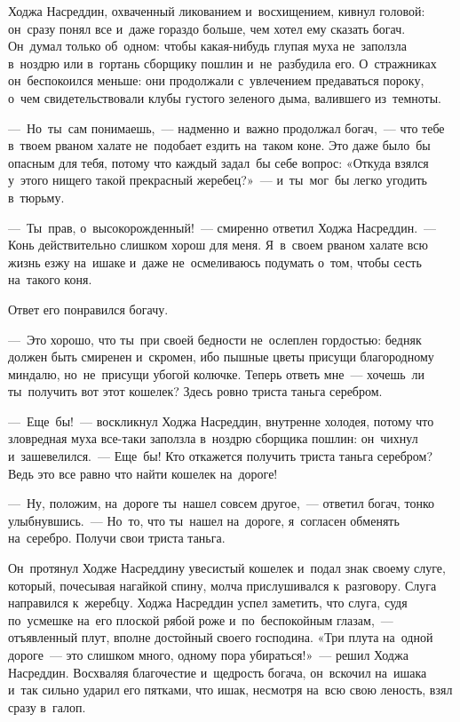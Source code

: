 \documentclass[12pt,a4paper]{book}
\begin{document}
Ходжа Насреддин, охваченный ликованием и~восхищением, кивнул головой: он~сразу понял все и~даже гораздо больше, чем хотел ему сказать богач. Он~думал только об~одном: чтобы какая-нибудь глупая муха не~заползла в~ноздрю или в~гортань сборщику пошлин и~не~разбудила его. О~стражниках он~беспокоился меньше: они продолжали с~увлечением предаваться пороку, о~чем свидетельствовали клубы густого зеленого дыма, валившего из~темноты.

—~Но~ты~сам понимаешь,~— надменно и~важно продолжал богач,~— что тебе в~твоем рваном халате не~подобает ездить на~таком коне. Это даже было~бы опасным для тебя, потому что каждый задал~бы себе вопрос: «Откуда взялся у~этого нищего такой прекрасный жеребец?»~— и~ты~мог~бы легко угодить в~тюрьму.

—~Ты~прав, о~высокорожденный!~— смиренно ответил Ходжа Насреддин.~— Конь действительно слишком хорош для меня. Я~в~своем рваном халате всю жизнь езжу на~ишаке и~даже не~осмеливаюсь подумать о~том, чтобы сесть на~такого коня.

Ответ его понравился богачу.

—~Это хорошо, что ты~при своей бедности не~ослеплен гордостью: бедняк должен быть смиренен и~скромен, ибо пышные цветы присущи благородному миндалю, но~не~присущи убогой колючке. Теперь ответь мне~— хочешь~ли ты~получить вот этот кошелек? Здесь ровно триста таньга серебром.

—~Еще~бы!~— воскликнул Ходжа Насреддин, внутренне холодея, потому что зловредная муха все-таки заползла в~ноздрю сборщика пошлин: он~чихнул и~зашевелился.~— Еще~бы! Кто откажется получить триста таньга серебром? Ведь это все равно что найти кошелек на~дороге!

—~Ну, положим, на~дороге ты~нашел совсем другое,~— ответил богач, тонко улыбнувшись.~— Но~то, что ты~нашел на~дороге, я~согласен обменять на~серебро. Получи свои триста таньга.

Он~протянул Ходже Насреддину увесистый кошелек и~подал знак своему слуге, который, почесывая нагайкой спину, молча прислушивался к~разговору. Слуга направился к~жеребцу. Ходжа Насреддин успел заметить, что слуга, судя по~усмешке на~его плоской рябой роже и~по~беспокойным глазам,~— отъявленный плут, вполне достойный своего господина. «Три плута на~одной дороге~— это слишком много, одному пора убираться!»~— решил Ходжа Насреддин. Восхваляя благочестие и~щедрость богача, он~вскочил на~ишака и~так сильно ударил его пятками, что ишак, несмотря на~всю свою леность, взял сразу в~галоп.
\end{document}
